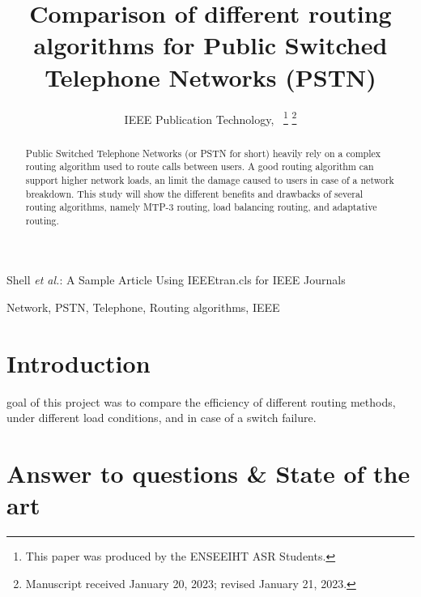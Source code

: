 \documentclass[lettersize,journal]{IEEEtran} %
\begin{document}
\title{Comparison of different routing algorithms for Public Switched Telephone Networks (PSTN)}

\author{IEEE Publication Technology,~
\thanks{This paper was produced by the ENSEEIHT ASR Students.}%
\thanks{Manuscript received January 20, 2023; revised January 21, 2023.}}

%
{Shell \MakeLowercase{\textit{et al.}}: A Sample Article Using IEEEtran.cls for IEEE Journals}


\maketitle

\begin{abstract}
        Public Switched Telephone Networks (or PSTN for short) heavily rely on a complex
        routing algorithm used to route calls between users. A good routing algorithm can
        support higher network loads, an limit the damage caused to users in case of a network
        breakdown. This study will show the different benefits and drawbacks of several routing algorithms,
        namely MTP-3 routing, load balancing routing, and adaptative routing.
\end{abstract}

\begin{IEEEkeywords}
Network, PSTN, Telephone, Routing algorithms, IEEE
\end{IEEEkeywords}

\section{Introduction}
 goal of this project was to compare
the efficiency of different routing methods, under different load conditions, and in case of a switch failure.

\section{Answer to questions \& State of the art}
\end{document}
